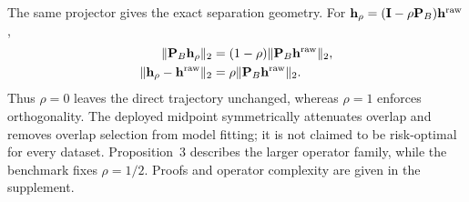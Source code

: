 The same projector gives the exact separation geometry. For
$\mathbf h_\rho=(\mathbf I-\rho\mathbf P_B)\mathbf h^{\rm raw}$,
\begin{align}
\|\mathbf P_B\mathbf h_\rho\|_2
&=(1-\rho)\|\mathbf P_B\mathbf h^{\rm raw}\|_2, \label{eq:leakage}\\
\|\mathbf h_\rho-\mathbf h^{\rm raw}\|_2
&=\rho\|\mathbf P_B\mathbf h^{\rm raw}\|_2. \label{eq:distortion}
\end{align}
Thus $\rho=0$ leaves the direct trajectory unchanged, whereas $\rho=1$
enforces orthogonality. The deployed midpoint symmetrically attenuates overlap
and removes overlap selection from model fitting; it is not claimed to be
risk-optimal for every dataset. Proposition~3 describes the larger operator
family, while the benchmark fixes $\rho=1/2$. Proofs and operator complexity
are given in the supplement.

